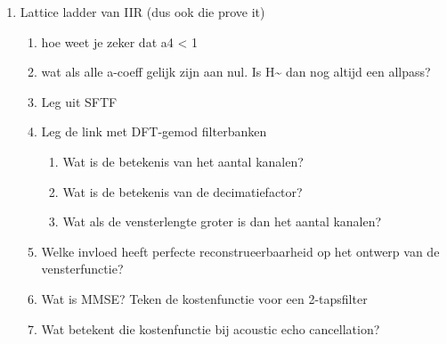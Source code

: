 \documentclass[
  a4paper,
  ,captions=tableheading
]{scrartcl}
\providecommand{\tightlist}{%
  \setlength{\itemsep}{0pt}\setlength{\parskip}{0pt}}
\begin{document}
\begin{enumerate}
\def\labelenumi{\arabic{enumi}.}
\tightlist
\item
  Lattice ladder van IIR (dus ook die prove it)

  \begin{enumerate}
  \def\labelenumii{\arabic{enumii}.}
  \setcounter{enumii}{1}
  \item
    hoe weet je zeker dat \textbar a4\textbar{} \textless{} 1\\
  \item
    wat als alle a-coeff gelijk zijn aan nul. Is H\textasciitilde{} dan
    nog altijd een allpass?\\
  \item
    Leg uit SFTF\\
  \item
    Leg de link met DFT-gemod filterbanken

    \begin{enumerate}
    \def\labelenumiii{\arabic{enumiii}.}
    \tightlist
    \item
      Wat is de betekenis van het aantal kanalen?\\
    \item
      Wat is de betekenis van de decimatiefactor?\\
    \item
      Wat als de vensterlengte groter is dan het aantal kanalen?\\
    \end{enumerate}
  \item
    Welke invloed heeft perfecte reconstrueerbaarheid op het ontwerp van
    de vensterfunctie?\\
  \item
    Wat is MMSE? Teken de kostenfunctie voor een 2-tapsfilter\\
  \item
    Wat betekent die kostenfunctie bij acoustic echo cancellation?


\end{enumerate}
\end{enumerate}
\end{document}
